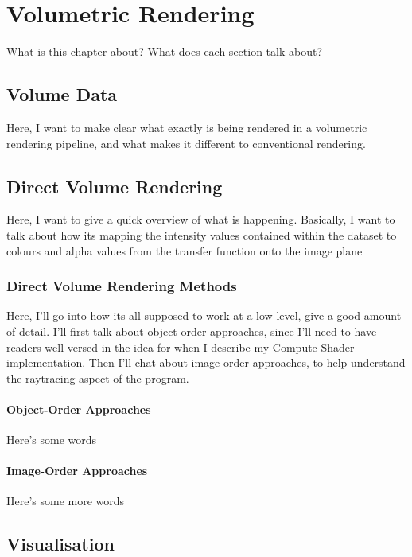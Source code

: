 \chapter{Volumetric Rendering}

What is this chapter about? What does each section talk about?

\section{Volume Data}

Here, I want to make clear what exactly is being rendered in a volumetric rendering pipeline, and what makes it different to conventional rendering.

\section{Direct Volume Rendering}

Here, I want to give a quick overview of what is happening. Basically, I want to talk about how its mapping the intensity values contained within the dataset to colours and alpha values from the transfer function onto the image plane

\subsection{Direct Volume Rendering Methods}

Here, I'll go into how its all supposed to work at a low level, give a good amount of detail. I'll first talk about object order approaches, since I'll need to have readers well versed in the idea for when I describe my Compute Shader implementation. Then I'll chat about image order approaches, to help understand the raytracing aspect of the program.
\subsubsection{Object-Order Approaches}

Here's some words

\subsubsection{Image-Order Approaches}

Here's some more words

\section{Visualisation}

